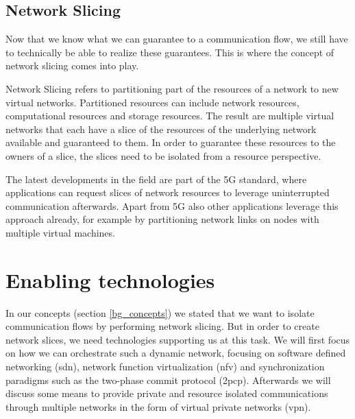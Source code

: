 \subsection{Network Slicing}
Now that we know what we can guarantee to a communication flow, we still have to technically be able to realize these guarantees. This is where the concept of network slicing comes into play.

Network Slicing \cite{slicing} refers to partitioning part of the resources of a network to new virtual networks. Partitioned resources can include network resources, computational resources and storage resources. The result are multiple virtual networks that each have a slice of the resources of the underlying network available and guaranteed to them. In order to guarantee these resources to the owners of a slice, the slices need to be isolated from a resource perspective.

The latest developments in the field are part of the 5G standard, where applications can request slices of network resources to leverage uninterrupted communication afterwards. Apart from 5G also other applications leverage this approach already, for example by partitioning network links on nodes with multiple virtual machines.


\section{Enabling technologies}
In our concepts (section \ref{bg_concepts}) we stated that we want to isolate communication flows by performing network slicing. But in order to create network slices, we need technologies supporting us at this task. We will first focus on how we can orchestrate such a dynamic network, focusing on software defined networking (\acrshort{sdn}), network function virtualization (\acrshort{nfv}) and synchronization paradigms such as the two-phase commit protocol (\acrshort{2pcp}). Afterwards we will discuss some means to provide private and resource isolated communications through multiple networks in the form of virtual private networks (\acrshort{vpn}).

